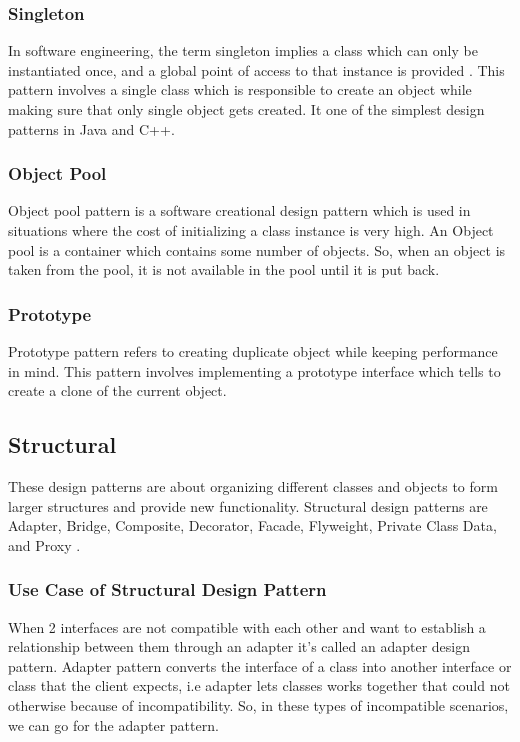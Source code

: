 \documentclass[sigplan,12pt,nonacm=true,review=false]{acmart}
\begin{document}
\subsubsection{Singleton}
In software engineering, the term singleton implies a class which can only be instantiated once, and a global point of access to that instance is provided \cite{noauthor_abstract_nodate-1}. This pattern involves a single class which is responsible to create an object while making sure that only single object gets created. It one of the simplest design patterns in Java and C++.

\subsubsection{Object Pool}
Object pool pattern is a software creational design pattern which is used in situations where the cost of initializing a class instance is very high. An Object pool is a container which contains some number of objects. So, when an object is taken from the pool, it is not available in the pool until it is put back.

\subsubsection{Prototype}
Prototype pattern refers to creating duplicate object while keeping performance in mind. This pattern involves implementing a prototype interface which tells to create a clone of the current object.

\subsection{Structural}
These design patterns are about organizing different classes and objects to form larger structures and provide new functionality. Structural design patterns are Adapter, Bridge, Composite, Decorator, Facade, Flyweight, Private Class Data, and Proxy \cite{kuchana_software_2004, zimmer_relationships_1995}.

\subsubsection{Use Case of Structural Design Pattern}
When 2 interfaces are not compatible with each other and want to establish a relationship between them through an adapter it’s called an adapter design pattern. Adapter pattern converts the interface of a class into another interface or class that the client expects, i.e adapter lets classes works together that could not otherwise because of incompatibility. So, in these types of incompatible scenarios, we can go for the adapter pattern.
\end{document}
